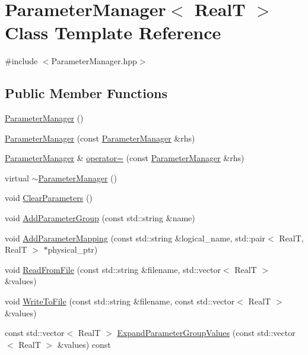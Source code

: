 \hypertarget{class_parameter_manager}{\section{Parameter\+Manager$<$ Real\+T $>$ Class Template Reference}
\label{class_parameter_manager}
}


{\ttfamily \#include $<$Parameter\+Manager.\+hpp$>$}

\subsection*{Public Member Functions}
\begin{DoxyCompactItemize}
\item 
\hyperlink{class_parameter_manager_acf5761f5c6da3ccf6dadcc32ddab086d}{Parameter\+Manager} ()
\item 
\hyperlink{class_parameter_manager_a28319548992949339ec13489b72bc6cc}{Parameter\+Manager} (const \hyperlink{class_parameter_manager}{Parameter\+Manager} \&rhs)
\item 
\hyperlink{class_parameter_manager}{Parameter\+Manager} \& \hyperlink{class_parameter_manager_a0eb5b3c2915e7af6ed0dd46cd0006fc5}{operator=} (const \hyperlink{class_parameter_manager}{Parameter\+Manager} \&rhs)
\item 
virtual \hyperlink{class_parameter_manager_aff6601bbafb934a2ee82650048062906}{$\sim$\+Parameter\+Manager} ()
\item 
void \hyperlink{class_parameter_manager_a2548d6948a60b5c0e5f8c8bf4674631f}{Clear\+Parameters} ()
\item 
void \hyperlink{class_parameter_manager_a5dd422fe934ddee56934324e00c54d5c}{Add\+Parameter\+Group} (const std\+::string \&name)
\item 
void \hyperlink{class_parameter_manager_ac10b74d055f4fddf68870a1a21e95fb3}{Add\+Parameter\+Mapping} (const std\+::string \&logical\+\_\+name, std\+::pair$<$ Real\+T, Real\+T $>$ $\ast$physical\+\_\+ptr)
\item 
void \hyperlink{class_parameter_manager_a252dfb04145a875f2ea6d0a66c021a97}{Read\+From\+File} (const std\+::string \&filename, std\+::vector$<$ Real\+T $>$ \&values)
\item 
void \hyperlink{class_parameter_manager_a836ef691153cf1c440da8cd3933395ad}{Write\+To\+File} (const std\+::string \&filename, const std\+::vector$<$ Real\+T $>$ \&values)
\item 
const std\+::vector$<$ Real\+T $>$ \hyperlink{class_parameter_manager_a0d879c87e8f22ade271707a3f5d1dd2a}{Expand\+Parameter\+Group\+Values} (const std\+::vector$<$ Real\+T $>$ \&values) const 

\end{DoxyCompactItemize}
